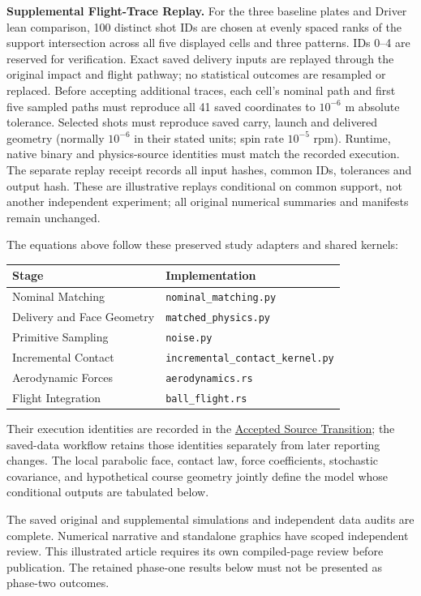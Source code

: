 \documentclass[11pt,letterpaper]{article}
\begin{document}
\textbf{Supplemental Flight-Trace Replay.} For the three baseline plates and
Driver lean comparison, 100 distinct shot IDs are chosen at evenly spaced ranks
of the support intersection across all five displayed cells and three patterns.
IDs 0--4 are reserved for verification. Exact saved delivery inputs are replayed
through the original impact and flight pathway; no statistical outcomes are
resampled or replaced. Before accepting additional traces, each cell's nominal
path and first five sampled paths must reproduce all 41 saved coordinates to
$10^{-6}$ m absolute tolerance. Selected shots must reproduce saved carry,
launch and delivered geometry (normally $10^{-6}$ in their stated units;
spin rate $10^{-5}$ rpm). Runtime, native binary and physics-source identities
must match the recorded execution. The separate replay receipt records all
input hashes, common IDs, tolerances and output hash. These are illustrative
replays conditional on common support, not another independent experiment;
all original numerical summaries and manifests remain unchanged.

The equations above follow these preserved study adapters and shared kernels:
\begin{center}\small
\begin{tabular}{ll}
\toprule
Stage & Implementation\\
\midrule
Nominal Matching & \texttt{nominal\_matching.py}\\
Delivery and Face Geometry & \texttt{matched\_physics.py}\\
Primitive Sampling & \texttt{noise.py}\\
Incremental Contact & \texttt{incremental\_contact\_kernel.py}\\
Aerodynamic Forces & \texttt{aerodynamics.rs}\\
Flight Integration & \texttt{ball\_flight.rs}\\
\bottomrule
\end{tabular}
\end{center}
Their execution identities
are recorded in the \href{phase2/source_transition_supplement.json}{Accepted
Source Transition}; the saved-data workflow retains those identities separately
from later reporting changes. The local parabolic face, contact law, force
coefficients, stochastic covariance, and hypothetical course geometry jointly
define the model whose conditional outputs are tabulated below.

The saved original and supplemental simulations and independent data audits are
complete. Numerical narrative and standalone graphics have scoped independent review. This illustrated article requires its own compiled-page review before publication. The retained
phase-one results below must not be presented as phase-two outcomes.
\end{document}
